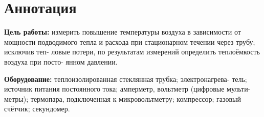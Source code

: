 \section{Аннотация}
\textbf{Цель работы:} измерить повышение температуры воздуха в зависимости от мощности
подводимого тепла и расхода при стационарном течении через трубу; исключив теп-
ловые потери, по результатам измерений определить теплоёмкость воздуха при посто-
янном давлении.

\textbf{Оборудование:} теплоизолированная стеклянная трубка; электронагрева-
тель; источник питания постоянного тока; амперметр, вольтметр (цифровые мульти-
метры); термопара, подключенная к микровольтметру; компрессор; газовый счётчик;
секундомер. 